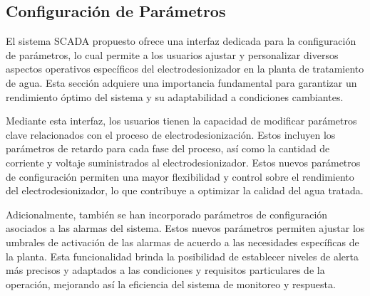 
\subsection{Configuración de Parámetros}
El sistema SCADA propuesto ofrece una interfaz dedicada para la configuración de parámetros, lo cual permite a los usuarios ajustar y personalizar diversos aspectos operativos específicos del electrodesionizador en la planta de tratamiento de agua. Esta sección adquiere una importancia fundamental para garantizar un rendimiento óptimo del sistema y su adaptabilidad a condiciones cambiantes.

Mediante esta interfaz, los usuarios tienen la capacidad de modificar parámetros clave relacionados con el proceso de electrodesionización. Estos incluyen los parámetros de retardo para cada fase del proceso, así como la cantidad de corriente y voltaje suministrados al electrodesionizador. Estos nuevos parámetros de configuración permiten una mayor flexibilidad y control sobre el rendimiento del electrodesionizador, lo que contribuye a optimizar la calidad del agua tratada.

Adicionalmente, también se han incorporado parámetros de configuración asociados a las alarmas del sistema. Estos nuevos parámetros permiten ajustar los umbrales de activación de las alarmas de acuerdo a las necesidades específicas de la planta. Esta funcionalidad brinda la posibilidad de establecer niveles de alerta más precisos y adaptados a las condiciones y requisitos particulares de la operación, mejorando así la eficiencia del sistema de monitoreo y respuesta.

